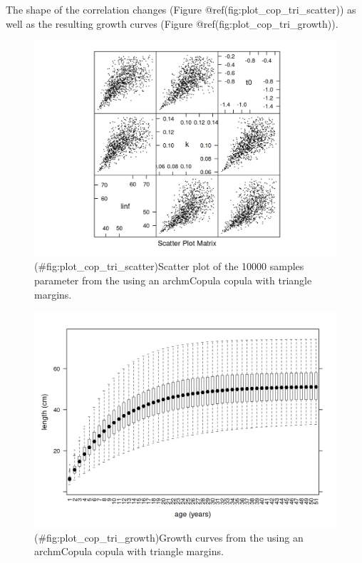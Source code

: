 \documentclass[
]{book}
\begin{document}
The shape of the correlation changes (Figure @ref(fig:plot\_cop\_tri\_scatter)) as well as the resulting growth curves (Figure @ref(fig:plot\_cop\_tri\_growth)).

\begin{figure}
\centering
\includegraphics{_bookdown_files/_main_files/figure-html/plot_cop_tri_scatter-1.png}
\caption{(\#fig:plot\_cop\_tri\_scatter)Scatter plot of the 10000 samples parameter from the using an archmCopula copula with triangle margins.}
\end{figure}

\begin{figure}
\centering
\includegraphics{_bookdown_files/_main_files/figure-html/plot_cop_tri_growth-1.png}
\caption{(\#fig:plot\_cop\_tri\_growth)Growth curves from the using an archmCopula copula with triangle margins.}
\end{figure}
\end{document}
